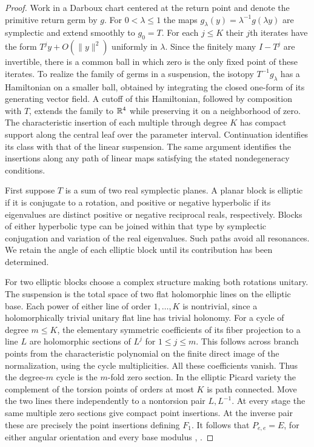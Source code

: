 \begin{proof}
Work in a Darboux chart centered at the return point and denote
the primitive return germ by $g$. For $0<\lambda\le1$ the maps
$g_\lambda(y)=\lambda^{-1}g(\lambda y)$ are symplectic and extend
smoothly to $g_0=T$. For each $j\le K$ their $j$th iterates have
the form $T^j y+O(\|y\|^2)$ uniformly in $\lambda$. Since the
finitely many $I-T^j$ are invertible, there is a common ball in
which zero is the only fixed point of these iterates. To realize the
family of germs in a suspension, the isotopy $T^{-1}g_\lambda$
has a Hamiltonian on a smaller ball, obtained by integrating the
closed one-form of its generating vector field. A cutoff of this
Hamiltonian, followed by composition with $T$, extends the family
to $\mathbb R^4$ while preserving it on a neighborhood of zero. The
characteristic insertion of each multiple through degree $K$ has
compact support along the central leaf over the parameter interval.
Continuation identifies its class with that of the linear suspension.
The same argument identifies the insertions along any path of
linear maps satisfying the stated nondegeneracy conditions.

First suppose $T$ is a sum of two real symplectic planes. A planar
block is elliptic if it is conjugate to a rotation, and positive or
negative hyperbolic if its eigenvalues are distinct positive or
negative reciprocal reals, respectively. Blocks of
either hyperbolic type can be joined within that type by symplectic
conjugation and variation of the real eigenvalues. Such paths avoid
all resonances. We retain the angle of each elliptic block until its
contribution has been determined.

For two elliptic blocks choose a complex structure making both
rotations unitary. The suspension is the total space of two flat
holomorphic lines on the elliptic base. Each power of either line
of order $1,\ldots,K$ is nontrivial, since a holomorphically trivial
unitary flat line has trivial holonomy. For a cycle of degree
$m\le K$, the elementary symmetric coefficients of its fiber
projection to a line $L$ are holomorphic sections of $L^j$ for
$1\le j\le m$. This follows across branch points from the
characteristic polynomial on the finite direct image of the
normalization, using the cycle multiplicities. All these coefficients
vanish. Thus the degree-$m$ cycle is the $m$-fold zero section.
In the elliptic Picard variety the complement of the torsion points
of orders at most $K$ is path connected. Move the two lines there
independently to a nontorsion pair $L,L^{-1}$. At every stage the
same multiple zero sections give compact point insertions. At the inverse pair these are precisely the point insertions defining
$F_1$. It follows that $P_{e,e}=E$, for either angular
orientation and every base modulus
\cite[Definition~4.7]{pardon}, \cite[\S3]{WueProduct}.


\end{proof}
